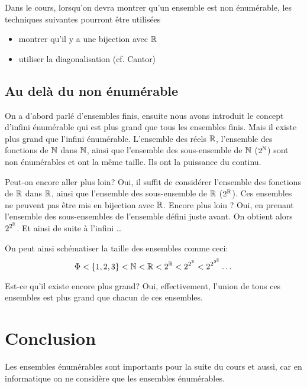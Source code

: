 Dans le cours, lorsqu'on devra montrer qu'un ensemble est non énumérable,
les techniques suivantes pourront être utilisées
\begin{itemize}
	\item montrer qu'il y a une bijection avec  $\mathbb{R}$
	\item utiliser la diagonalisation (cf. Cantor)
\end{itemize}


\subsection{Au delà du non énumérable}
\label{subsec:au_dela_du_non_enumerable}
On a d'abord parlé d'ensembles finis, ensuite nous avons introduit le concept d'infini 
énumérable qui est plus grand que tous les ensembles finis. Mais il existe plus grand 
que l'infini énumérable.   L'ensemble des réels $\mathbb{R}$, l'ensemble des fonctions de $\mathbb{N}$ dans $\mathbb{N}$, ainsi que 
l'ensemble des sous-ensemble de $\mathbb{N}$ ($2^{\mathbb{N}}$) sont non énumérables et ont la même taille.  Ils ont la puissance du continu. 

Peut-on encore aller plus loin?  Oui,  il suffit de considérer  l'ensemble des fonctions de $\mathbb{R}$ dans $\mathbb{R}$, ainsi que 
l'ensemble des sous-ensemble de $\mathbb{R}$ ($2^{\mathbb{R}}$).  Ces ensembles ne peuvent pas être mis en bijection avec $\mathbb{R}$.
Encore plus loin ?  Oui, en prenant l'ensemble des sous-ensembles de l'ensemble défini juste avant.  On obtient alors $2^{2^{\mathbb{R}}}$.  Et ainsi de suite à l'infini \ldots

On peut ainsi schématiser la taille des ensembles comme ceci:
$$\Phi < \{1,2,3\} < \mathbb{N} < \mathbb{R} < 2^{\mathbb{R}} < 2^{2^{\mathbb{R}}} < 2^{2^{2^{\mathbb{R}}}} \dots$$

Est-ce qu'il existe encore plus grand? Oui, effectivement, l'union de tous ces ensembles 
est plus grand que chacun de ces ensembles.


\section{Conclusion}
\label{sec:concept_conclusion}

Les ensembles énumérables sont importants pour la suite du cours et aussi, car en
informatique on ne considère que les ensembles énumérables.

